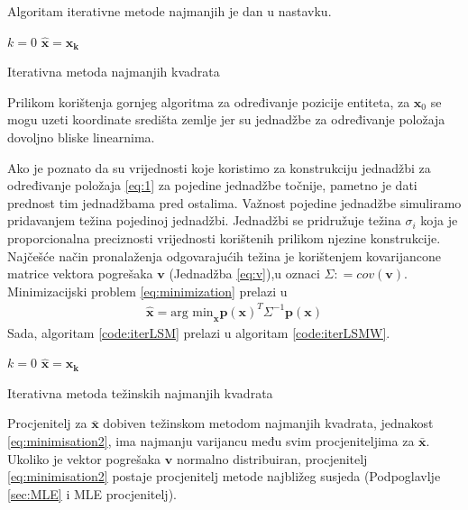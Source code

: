 \documentclass[a4paper,twoside,12pt]{memoir} %
\begin{document}
Algoritam iterativne metode najmanjih je dan u nastavku.

\begin{algorithm}[H]
	$k = 0$ \;
	$\hat{\mathbf{x}} = \mathbf{x_k}$
\caption{Iterativna metoda najmanjih kvadrata}
\label{code:iterLSM}
\end{algorithm}

Prilikom korištenja gornjeg algoritma za određivanje pozicije entiteta, za $\mathbf{x}_0$ se mogu uzeti koordinate središta zemlje jer su jednadžbe za određivanje položaja dovoljno bliske linearnima.

Ako je poznato da su vrijednosti koje koristimo za konstrukciju
jednadžbi za određivanje položaja \ref{eq:1} za pojedine jednadžbe točnije,
pametno je dati prednost tim jednadžbama pred ostalima.
Važnost pojedine jednadžbe simuliramo pridavanjem težina pojedinoj jednadžbi.
Jednadžbi se pridružuje težina $\sigma_i$ koja je proporcionalna preciznosti 
vrijednosti korištenih prilikom njezine konstrukcije.
Najčešće način pronalaženja odgovarajućih težina je
korištenjem kovarijancone matrice
vektora pogrešaka $\mathbf{v}$ (Jednadžba \ref{eq:v}),u oznaci $\Sigma : = cov(\mathbf{v})$. Minimizacijski problem \ref{eq:minimization} prelazi u %
\begin{align}\label{eq:minimisation2}
\hat{\mathbf{x}} = \text{arg min}_\mathbf{x} \mathbf{p}(\mathbf{x})^T \Sigma^{-1} \mathbf{p}(\mathbf{x})
\end{align}%
Sada, algoritam \ref{code:iterLSM} prelazi u algoritam \ref{code:iterLSMW}.

\begin{algorithm}[H]
	$k = 0$ \;
	$\hat{\mathbf{x}} = \mathbf{x_k}$
	\caption{Iterativna metoda težinskih najmanjih kvadrata}
	\label{code:iterLSMW}
\end{algorithm}
Procjenitelj za $\bar{\mathbf{x}}$ dobiven težinskom metodom najmanjih kvadrata, jednakost \ref{eq:minimisation2}, ima najmanju varijancu među svim procjeniteljima za
$\bar{\mathbf{x}}$. Ukoliko je vektor pogrešaka $\mathbf{v}$ normalno
distribuiran, procjenitelj \ref{eq:minimisation2} postaje procjenitelj
metode najbližeg susjeda (Podpoglavlje \ref{sec:MLE} i MLE procjenitelj).
\end{document}
